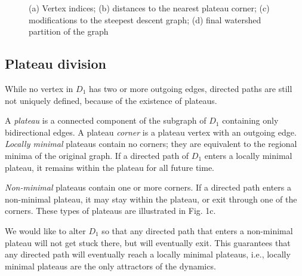 \documentclass{article}\usepackage{times}
\begin{document}
\begin{figure}

  \protect\caption{(a) Vertex indices; (b) distances to the nearest
    plateau corner; (c) modifications to the steepest descent graph;
    (d) final watershed partition of the graph}
\end{figure}

\subsection{Plateau division}
While no vertex in $D_1$ has two or more outgoing edges, directed
paths are still not uniquely defined, because of the existence of
plateaus.

A \emph{plateau} is a connected component of the subgraph of $D_1$
containing only bidirectional edges.  A plateau \emph{corner} is a
plateau vertex with an outgoing edge.
\emph{Locally minimal} plateaus contain no corners; they are
equivalent to the regional minima of the original graph.  If a
directed path of $D_1$ enters a locally minimal plateau, it remains
within the plateau for all future time.

\emph{Non-minimal} plateaus contain one or more corners.  If a
directed path enters a non-minimal plateau, it may stay within the
plateau, or exit through one of the corners.  These types
of plateaus are illustrated in Fig. 1c.

We would like to alter $D_1$ so that any directed path that enters a
non-minimal plateau will not get stuck there, but will eventually
exit.  This guarantees that any directed path will eventually reach a
locally minimal plateaus, i.e., locally minimal plateaus are the only
attractors of the dynamics.
\end{document}
